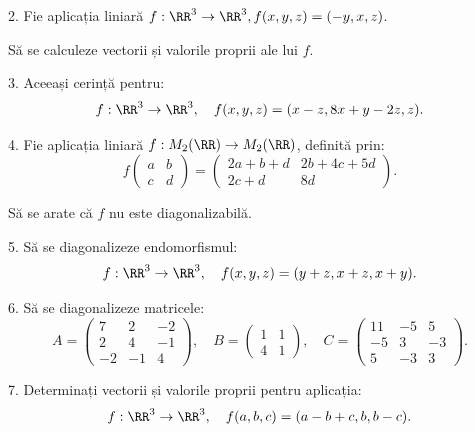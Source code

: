 2. Fie aplicația liniară $ f : \RR^3 \to \RR^3, f(x, y, z) = (-y, x, z) $.

Să se calculeze vectorii și valorile proprii ale lui $ f $.

\vspace{0.3cm}

3. Aceeași cerință pentru:
\[
  f : \RR^3 \to \RR^3, \quad f(x, y, z) = (x - z, 8x + y - 2z, z).
\]

4. Fie aplicația liniară $ f : M_2(\RR) \to M_2(\RR) $, definită prin:
\[
  f \begin{pmatrix} a & b \\ c & d \end{pmatrix} = %
  \begin{pmatrix} 2a + b + d & 2b + 4c + 5d \\ 2c + d & 8d \end{pmatrix}.
\]

Să se arate că $ f $ nu este diagonalizabilă.

\vspace{0.3cm}

5. Să se diagonalizeze endomorfismul:
\[
  f : \RR^3 \to \RR^3, \quad f(x, y, z) = (y + z, x + z, x + y).
\]

6. Să se diagonalizeze matricele:
\[
  A = \begin{pmatrix}
    7 & 2 & -2 \\
    2 & 4 & -1 \\
    -2 & -1 & 4
  \end{pmatrix}, \quad %
  B = \begin{pmatrix}
    1 & 1 \\ 4 & 1
  \end{pmatrix}, \quad %
  C = \begin{pmatrix}
    11 & -5 & 5 \\
    -5 & 3 & -3 \\
    5 & -3 & 3
  \end{pmatrix}.
\]


7. Determinați vectorii și valorile proprii pentru aplicația:
\[
  f : \RR^3 \to \RR^3, \quad f(a, b, c) = (a - b + c, b, b-c).
\]


